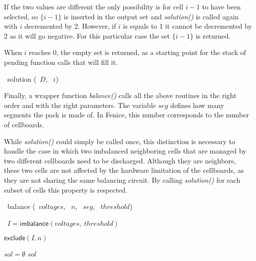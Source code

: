 If the two values are different the only possibility is for cell $i-1$ to have been selected, so $\{i-1\}$ is inserted in the output set and \textit{solution()} is called again with $i$ decremented by 2. However, if $i$ is equals to 1 it cannot be decremented by 2 as it will go negative. For this particular case the set $\{i-1\}$ is returned.

When $i$ reaches 0, the empty set is returned, as a starting point for the stack of pending function calls that will fill it.

\begin{algorithm}[H]
    \DontPrintSemicolon
    \NoCaptionOfAlgo
    \caption[solution]{\SET\ \textsf{solution} (\INTARRAY\ $D$, \INTEGER\ $i$)}\label{algorithm:solution}
\end{algorithm}

Finally, a wrapper function \textit{balance()} calls all the above routines in the right order and with the right parameters. The variable $seg$ defines how many segments the pack is made of. In Fenice, this number corresponds to the number of cellboards.

While \textit{solution()} could simply be called once, this distinction is necessary to handle the case in which two imbalanced neighboring cells that are managed by two different cellboards need to be discharged. Although they are neighbors, these two cells are not affected by the hardware limitation of the cellboards, as they are not sharing the same balancing circuit. By calling \textit{solution()} for each subset of cells this property is respected.
\begin{algorithm}
    \DontPrintSemicolon
    \NoCaptionOfAlgo
    \caption[balancing]{\SET\ \textsf{balance} (\INTARRAY\ $voltages$, \INTEGER\ $n$, \INTEGER\ $seg$, \INTEGER\ $threshold$)}\label{algorithm:balancing}

    \INTARRAY\ $I = \textsf{imbalance}(voltages,\ threshold)$\;


    $\textsf{exclude}(I, n)$\;

    $sol=\emptyset$\;
    \Return $sol$\;
\end{algorithm}

